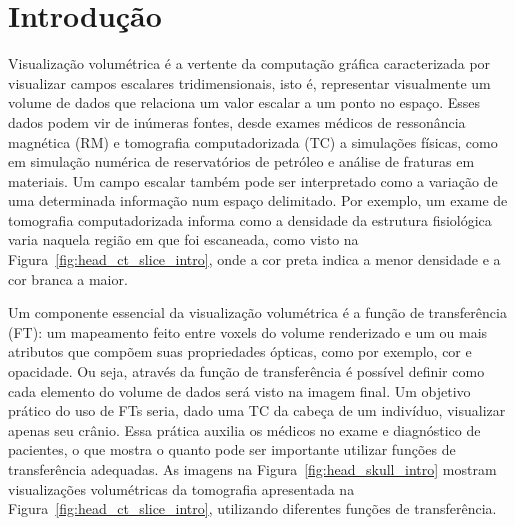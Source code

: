 
\chapter{Introdução}
\label{ch:intro}
	Visualização volumétrica é a vertente da computação gráfica caracterizada por visualizar campos escalares tridimensionais, isto é, representar visualmente um volume de dados que relaciona um valor escalar a um ponto no espaço. Esses dados podem vir de inúmeras fontes, desde exames médicos de ressonância magnética (RM) e tomografia computadorizada (TC) a simulações físicas, como em simulação numérica de reservatórios de petróleo e análise de fraturas em materiais. Um campo escalar também pode ser interpretado como a variação de uma determinada informação num espaço delimitado. Por exemplo, um exame de tomografia computadorizada informa como a densidade da estrutura fisiológica varia naquela região em que foi escaneada, como visto na Figura~\ref{fig:head_ct_slice_intro}, onde a cor preta indica a menor densidade e a cor branca a maior.
    
    Um componente essencial da visualização volumétrica é a função de transferência (FT): um mapeamento feito entre voxels do volume renderizado e um ou mais atributos que compõem suas propriedades ópticas, como por exemplo, cor e opacidade. Ou seja, através da função de transferência é possível definir como cada elemento do volume de dados será visto na imagem final. Um objetivo prático do uso de FTs seria, dado uma TC da cabeça de um indivíduo, visualizar apenas seu crânio. Essa prática auxilia os médicos no exame e diagnóstico de pacientes, o que mostra o quanto pode ser importante utilizar funções de transferência adequadas. As imagens na Figura~\ref{fig:head_skull_intro} mostram visualizações volumétricas da tomografia apresentada na Figura~\ref{fig:head_ct_slice_intro}, utilizando diferentes funções de transferência.
    
